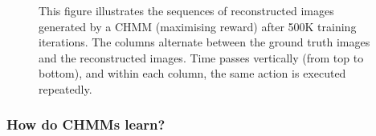\documentclass[twoside,11pt]{article}
\providecommand{\DIFaddendFL}{} %
\begin{document}
\begin{figure}[H]
\begin{center}
{\begin{figure}[H]
\begin{center}
	\DIFaddendFL \end{center}
\end{figure}
}
	\end{center}
   \caption{This figure illustrates the sequences of reconstructed images generated by a CHMM (maximising reward) after 500K training iterations. The columns alternate between the ground truth images and the reconstructed images. Time passes vertically (from top to bottom), and within each column, the same action is executed repeatedly.}
   \label{fig:CHMM_reconstruction}
\end{figure}


\subsubsection{How do CHMMs learn?}
\end{document}
